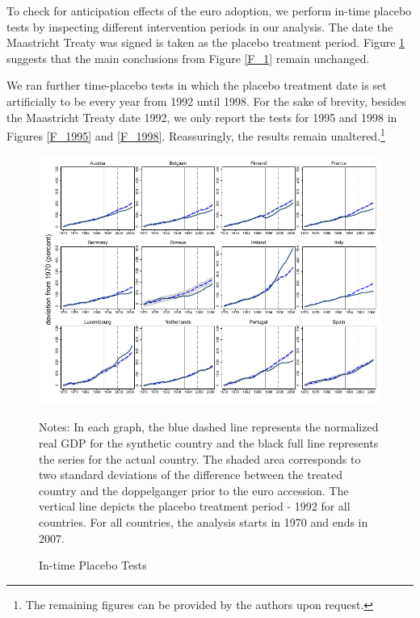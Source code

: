 \documentclass[12pt]{article}
\newcommand{\annote}[1]{\parbox{\textwidth}{\renewcommand{\baselinestretch}{1.0}\vspace{12pt} \small Notes: #1}}
\begin{document}
To check for anticipation effects of the euro adoption, we perform in-time placebo tests by inspecting different intervention periods in our analysis. The date the Maastricht Treaty was signed is taken as the placebo treatment period. Figure \ref{F_Maastricht} suggests that the main conclusions from Figure \ref{F_1} remain unchanged.

We ran further time-placebo tests in which the placebo treatment date is set artificially to be every year from 1992 until 1998. For the sake of brevity, besides the Maastricht Treaty date 1992, we only report the tests for 1995 and 1998 in Figures \ref{F_1995} and \ref{F_1998}. Reassuringly, the results remain unaltered.\footnote{The remaining figures can be provided by the authors upon request.}

\begin{figure}[h!]
    \centering
    \caption{In-time Placebo Tests}
    \includegraphics[scale=1.2]{Output/Figures/SCM_gdp_Rob_1992_Annual.pdf}
    \annote{In each graph, the blue dashed line represents the normalized real GDP for the synthetic country and the black full line represents the series for the actual country. The shaded area corresponds to two standard deviations of the difference between the treated country and the doppelganger prior to the euro accession. The vertical line depicts the placebo treatment period - 1992 for all countries. For all countries, the analysis starts in 1970 and ends in 2007. %
    }
    \label{F_Maastricht}
\end{figure}
\end{document}
